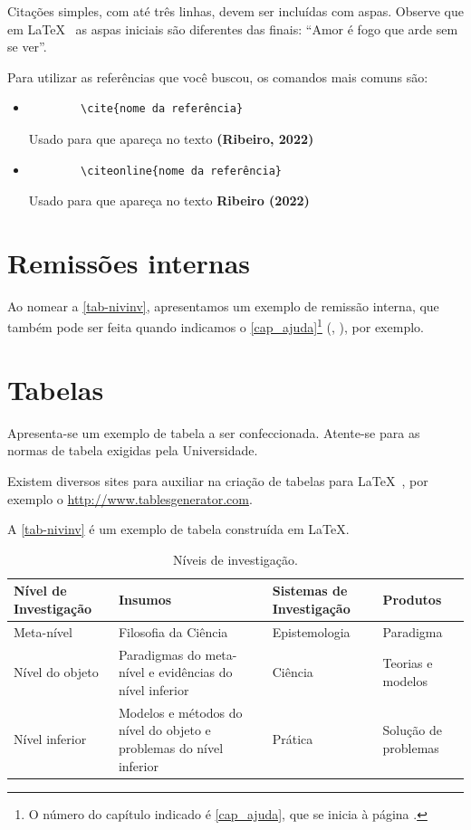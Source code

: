 Citações simples, com até três linhas, devem ser incluídas com aspas. Observe que em \LaTeX~ as aspas iniciais são diferentes das finais: ``Amor é fogo que arde sem se ver''. 

Para utilizar as referências que você buscou, os comandos mais comuns são:

\begin{itemize}
	\item \begin{verbatim}
		\cite{nome da referência} 
		\end{verbatim}
		Usado para que apareça no texto \textbf{(Ribeiro, 2022)}
	\item \begin{verbatim}
		\citeonline{nome da referência} 
		\end{verbatim}
		Usado para que apareça no texto \textbf{Ribeiro (2022)}
\end{itemize}

\section{Remissões internas}

Ao nomear a \autoref{tab-nivinv}, apresentamos um exemplo de remissão interna, que também pode ser feita quando indicamos o \autoref{cap_ajuda}\footnote{O número do capítulo indicado é \ref{cap_ajuda}, que se inicia à página \pageref{cap_ajuda}.}
(, ), por exemplo.

\section{Tabelas}

Apresenta-se um exemplo de tabela a ser confeccionada. Atente-se para as normas de tabela exigidas pela Universidade.

Existem diversos sites para auxiliar na criação de tabelas para \LaTeX~, por exemplo o \url{http://www.tablesgenerator.com}.

A \autoref{tab-nivinv} é um exemplo de tabela construída em
\LaTeX.

\begin{table}[htb]
\footnotesize
\caption[Níveis de investigação]{Níveis de investigação.}
\label{tab-nivinv}
\begin{tabular}{p{2.6cm}|p{6.0cm}|p{2.25cm}|p{3.40cm}}
   \hline
   \textbf{Nível de \newline Investigação} & \textbf{Insumos}  & \textbf{Sistemas de Investigação}  & \textbf{Produtos}  \\
   \hline
   Meta-nível & Filosofia\index{filosofia} da Ciência  & Epistemologia & Paradigma  \\
   Nível do objeto & Paradigmas do meta-nível e evidências do nível inferior & Ciência  & Teorias e modelos \\
   Nível inferior & Modelos e métodos do nível do objeto e problemas do nível inferior & Prática & Solução de problemas  \\
   \hline
\end{tabular}
\end{table}

